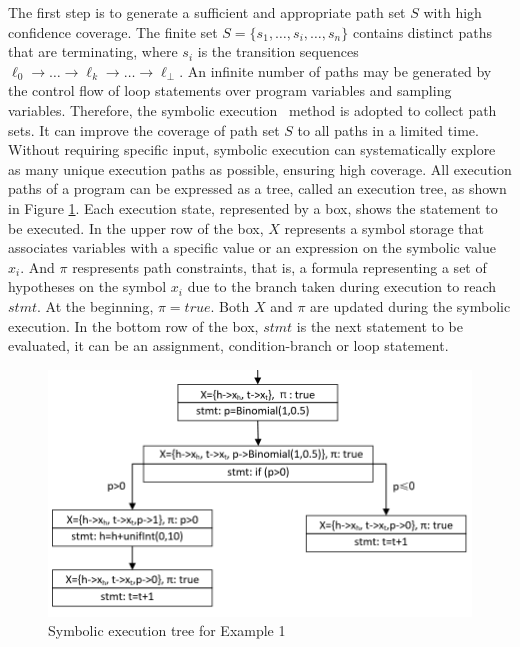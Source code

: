 \documentclass[conference]{IEEEtran}
\begin{document}
The first step is to generate a sufficient and appropriate path set $S$ with high confidence coverage. The finite set $S=\{s_1,\dots,s_i,\dots,s_n\}$ contains distinct paths that are terminating, where $s_i$ is the transition sequences $\ell_0 \to \dots \to \ell_k \to \dots \to \ell_\bot$. An infinite number of paths may be generated by the control flow of loop statements over program variables and sampling variables. Therefore, the symbolic execution~\cite{Geldenhuys2012symbolic} method is adopted to collect path sets. It can improve the coverage of path set $S$ to all paths in a limited time. Without requiring specific input, symbolic execution can systematically explore as many unique execution paths as possible, ensuring high coverage. All execution paths of a program can be expressed as a tree, called an execution tree, as shown in Figure \ref{executionTree}. Each execution state, represented by a box, shows the statement to be executed. In the upper row of the box, $X$ represents a symbol storage that associates variables with a specific value or an expression on the symbolic value $x_i$. And $\pi$ respresents path constraints, that is, a formula representing a set of hypotheses on the symbol $x_i$ due to the branch taken during execution to reach $stmt$. At the beginning, $\pi=true$. Both $X$ and $\pi$ are updated during the symbolic execution. In the bottom row of the box, $stmt$ is the next statement to be evaluated, it can be an assignment, condition-branch or loop statement.

\begin{figure}[h]
	\centering
	\includegraphics[scale=0.6]{img/executionTree}
	\caption{Symbolic execution tree for Example 1}
	\label{executionTree}
\end{figure}
\end{document}
